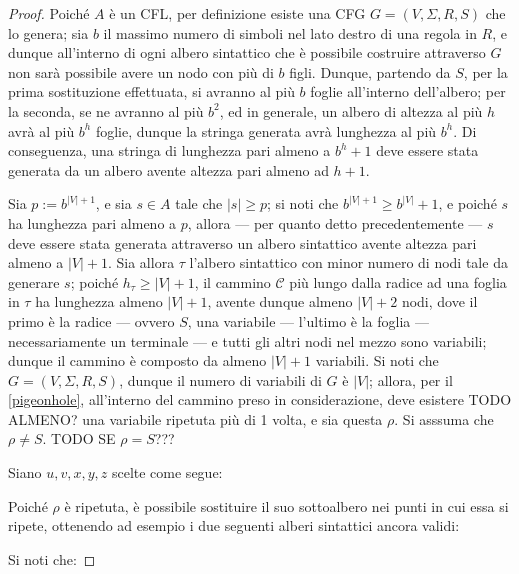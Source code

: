 \documentclass[a4paper, 12pt]{report}
\begin{document}
    \begin{proof}
        Poiché $A$ è un CFL, per definizione esiste una CFG $G= (V, \Sigma, R, S)$ che lo genera; sia $b$ il massimo numero di simboli nel lato destro di una regola in $R$, e dunque all'interno di ogni albero sintattico che è possibile costruire attraverso $G$ non sarà possibile avere un nodo con più di $b$ figli. Dunque, partendo da $S$, per la prima sostituzione effettuata, si avranno al più $b$ foglie all'interno dell'albero; per la seconda, se ne avranno al più $b^2$, ed in generale, un albero di altezza al più $h$ avrà al più $b^h$ foglie, dunque la stringa generata avrà lunghezza al più $b^h$. Di conseguenza, una stringa di lunghezza pari almeno a $b^h + 1$ deve essere stata generata da un albero avente altezza pari almeno ad $h + 1$.

        Sia $p := b^{|V| + 1}$, e sia $s \in A$ tale che $|s| \ge p$; si noti che $b^{|V| + 1} \ge b^{|V|} + 1$, e poiché $s$ ha lunghezza pari almeno a $p$, allora --- per quanto detto precedentemente --- $s$ deve essere stata generata attraverso un albero sintattico avente altezza pari almeno a $|V| + 1$. Sia allora $\tau$ l'albero sintattico con minor numero di nodi tale da generare $s$; poiché $h_\tau \ge |V| + 1$, il cammino $\mathscr{C}$ più lungo dalla radice ad una foglia in $\tau$ ha lunghezza almeno $|V| + 1$, avente dunque almeno $|V| + 2$ nodi, dove il primo è la radice --- ovvero $S$, una variabile --- l'ultimo è la foglia --- necessariamente un terminale --- e tutti gli altri nodi nel mezzo sono variabili; dunque il cammino è composto da almeno $|V| + 1$ variabili. Si noti che $G = (V, \Sigma, R, S)$, dunque il numero di variabili di $G$ è $|V|$; allora, per il \cref{pigeonhole}, all'interno del cammino preso in considerazione, deve esistere TODO ALMENO? una variabile ripetuta più di 1 volta, e sia questa $\rho$. Si asssuma che $\rho \neq S$. TODO SE $\rho = S$???

        Siano $u, v, x, y, z$ scelte come segue:


        Poiché $\rho$ è ripetuta, è possibile sostituire il suo sottoalbero nei punti in cui essa si ripete, ottenendo ad esempio i due seguenti alberi sintattici ancora validi:
        

        Si noti che: 


\end{proof}
\end{document}
